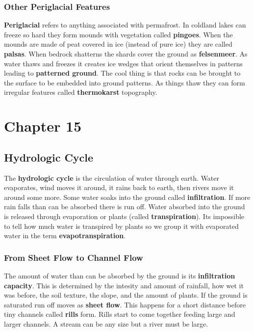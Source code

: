 \documentclass{article}
\begin{document}
\subsubsection{Other Periglacial Features} %
\label{ssub:other_periglacial_features}
\textbf{Periglacial} refers to anything associated with permafrost. In coldland lakes can freeze so hard they form mounds with vegetation called \textbf{pingoes}. When the mounds are made of peat covered in ice (instead of pure ice) they are called \textbf{palsas}. When bedrock shatterns the shards cover the ground as \textbf{felsenmeer}. As water thaws and freezes it creates ice wedges that orient themselves in patterns leading to \textbf{patterned ground}. The cool thing is that rocks can be brought to the surface to be embedded into ground patterns. As things thaw they can form irregular features called \textbf{thermokarst} topography.


\section{Chapter 15} %
\label{sec:chapter_15}
\subsection{Hydrologic Cycle} %
\label{sub:hydrologic_cycle}
The \textbf{hydrologic cycle} is the circulation of water through earth. Water evaporates, wind moves it around, it rains back to earth, then rivers move it around some more. Some water soaks into the ground called \textbf{infiltration}. If more rain falls than can be absorbed there is run off. Water absorbed into the ground is released through evaporation or plants (called \textbf{transpiration}). Its impossible to tell how much water is transpired by plants so we group it with evaporated water in the term \textbf{evapotranspiration}.

\subsubsection{From Sheet Flow to Channel Flow} %
\label{ssub:from_sheet_flow_to_channel_flow}
The amount of water than can be absorbed by the ground is its \textbf{infiltration capacity}. This is determined by the intesity and amount of rainfall, how wet it was before, the soil texture, the slope, and the amount of plants. If the ground is saturated run off moves as \textbf{sheet flow}. This happens for a short distance before tiny channels called \textbf{rills} form. Rills start to come together feeding large and larger channels. A stream can be any size but a river must be large.
\end{document}
